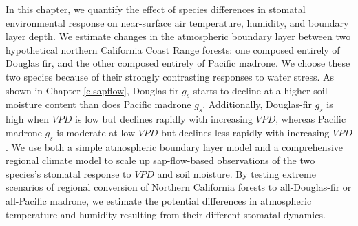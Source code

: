 In this chapter, we quantify the effect of species differences in stomatal environmental response on near-surface air temperature, humidity, and boundary layer depth.  We estimate changes in the atmospheric boundary layer between two hypothetical northern California Coast Range forests: one composed entirely of Douglas fir, and the other composed entirely of Pacific madrone.  We choose these two species because of their strongly contrasting responses to water stress.  As shown in Chapter \ref{c.sapflow}, Douglas fir $g_s$ starts to decline at a higher soil moisture content than does Pacific madrone $g_s$.  Additionally, Douglas-fir $g_s$ is high when $VPD$ is low but declines rapidly with increasing $VPD$, whereas Pacific madrone $g_s$ is moderate at low $VPD$ but declines less rapidly with increasing $VPD$.  We use both a simple atmospheric boundary layer model and a comprehensive regional climate model to scale up sap-flow-based observations of the two species's stomatal response to $VPD$ and soil moisture.  By testing extreme scenarios of regional conversion of Northern California forests to all-Douglas-fir or all-Pacific madrone, we estimate the potential differences in atmospheric temperature and humidity resulting from their different stomatal dynamics.
